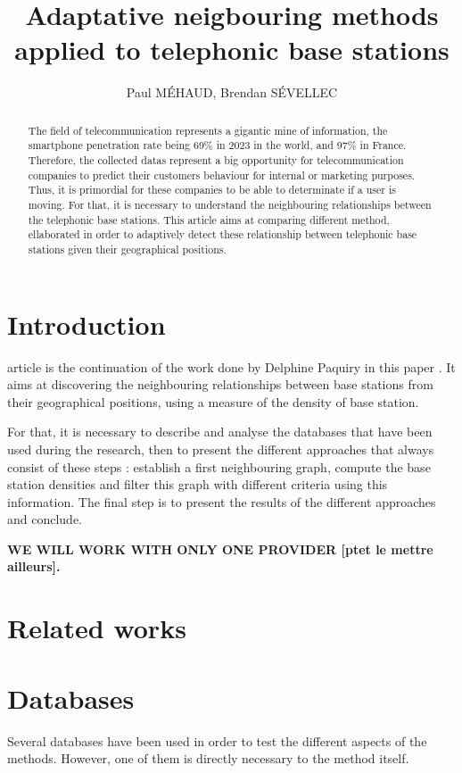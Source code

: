 \documentclass[lettersize,journal,english]{IEEEtran}
\title{Adaptative neigbouring methods applied to telephonic base stations}
\author{Paul MÉHAUD, Brendan SÉVELLEC}
\begin{document}
\maketitle

\begin{abstract}
  The field of telecommunication represents a gigantic mine of information, the smartphone penetration rate being 69\%
  in 2023 in the world, and 97\% in France. Therefore, the collected datas represent a big opportunity for telecommunication
  companies to predict their customers behaviour for internal or marketing purposes. Thus, it is primordial for these companies
  to be able to determinate if a user is moving. For that, it is necessary to understand the neighbouring relationships between the 
  telephonic base stations. This article aims at comparing different method, ellaborated in order to adaptively detect these
  relationship between telephonic base stations given their geographical positions.
\end{abstract}

\section{Introduction}
     article is the continuation of the work done by Delphine Paquiry in this paper \cite{art_del_paq}.
    It aims at discovering the neighbouring relationships between base stations from their geographical positions, using a 
    measure of the density of base station.

    For that, it is necessary to describe and analyse the databases that have been used during the research, then to present 
    the different approaches that always consist of these steps : establish a first neighbouring graph, compute the base station 
    densities and filter this graph with different criteria using this information. The final step is to present the results
    of the different approaches and conclude.

    \textbf{WE WILL WORK WITH ONLY ONE PROVIDER [ptet le mettre ailleurs].}
\section{Related works}

\section{Databases}
    Several databases have been used in order to test the different aspects of the methods. However, one of
    them is directly necessary to the method itself.
\end{document}

